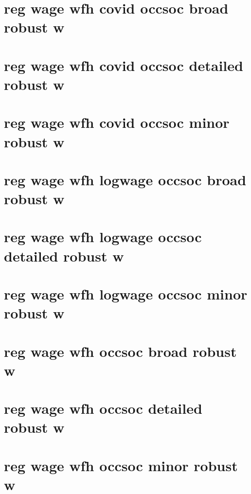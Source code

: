 \documentclass{article}
\begin{document}
\tableofcontents
\newpage
\section{reg wage wfh  covid occsoc broad robust w}

\newpage
\section{reg wage wfh  covid occsoc detailed robust w}

\newpage
\section{reg wage wfh  covid occsoc minor robust w}

\newpage
\section{reg wage wfh  logwage occsoc broad robust w}

\newpage
\section{reg wage wfh  logwage occsoc detailed robust w}

\newpage
\section{reg wage wfh  logwage occsoc minor robust w}

\newpage
\section{reg wage wfh  occsoc broad robust w}

\newpage
\section{reg wage wfh  occsoc detailed robust w}

\newpage
\section{reg wage wfh  occsoc minor robust w}

\newpage
\end{document}
